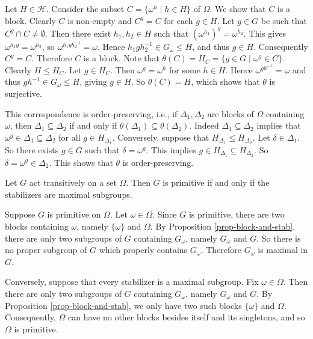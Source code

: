 \begin{sketch}
	Let $H\in\mathcal{H}$. Consider the subset $C = \{\omega^h \mid h \in H\}$ of $\Omega$. We show that $C$ is a block. Clearly $C$ is non-empty and $C^g = C$ for each $g\in H$. Let $g \in G$ be such that $C^g \cap C\neq \emptyset$. Then there exist $h_1, h_2 \in H$ such that $(\omega^{h_1})^g = \omega^{h_2}$. This gives $\omega^{h_1g} = \omega^{h_2}$, so $\omega^{h_1gh_2^{-1}} = \omega$. Hence $h_1gh_2^{-1} \in G_\omega \le H$, and thus $g \in H$. Consequently $C^g = C$. Therefore $C$ is a block. Note that $\theta(C) = H_C = \{g \in G \mid \omega^g \in C\}$. Clearly $H \le H_C$. Let $g \in H_C$. Then $\omega^g = \omega^h$ for some $h \in H$. Hence $\omega^{gh^{-1}} = \omega$ and thus $gh^{-1} \in G_\omega \le H$, giving $g \in H$. So $\theta(C) = H$, which shows that $\theta$ is surjective.
\end{sketch}
\begin{remark}
	This correspondence is order-preserving, i.e., if $\Delta_1,\Delta_2$ are blocks of $\Omega$ containing $\omega$, then $\Delta_1\subseteq \Delta_2$ if and only if $\theta(\Delta_1)\subseteq \theta(\Delta_2)$. Indeed $\Delta_1\subseteq \Delta_2$ implies that $\omega^g \in \Delta_1\subseteq \Delta_2$ for all $g\in H_{\Delta_1}$. Conversely, suppose that $H_{\Delta_1}\leq H_{\Delta_2}$. Let $\delta\in \Delta_1$. So there exists $g\in G$ such that $\delta = \omega^g$. This implies $g\in H_{\Delta_1}\subseteq H_{\Delta_2}$. So $\delta = \omega^g \in \Delta_2$. This shows that $\theta$ is order-preserving.
\end{remark}

\begin{corollary}
	Let $G$ act transitively on a set $\Omega$. Then $G$ is primitive if and only
	if the stabilizers are maximal subgroups.
\end{corollary}
\begin{sketch}
	Suppose $G$ is primitive on $\Omega$. Let $\omega \in \Omega$.  Since $G$ is primitive, there are  two  blocks containing $\omega$, namely $\{\omega\}$ and $\Omega$.  By Proposition \ref{prop-block-and-stab}, there are only two subgroups of $G$ containing $G_\omega$, namely $G_\omega$ and $G$. So there is no proper subgroup of $G$ which properly contains $G_\omega$. Therefore $G_\omega$ is maximal in $G$.
	
	Conversely, suppose that every stabilizer is a maximal subgroup. Fix $\omega\in \Omega$. Then there are only two subgroups of $G$ containing $G_\omega$, namely $G_\omega$ and $G$. By Proposition \ref{prop-block-and-stab}, we only have two such blocks $\{\omega\}$ and $\Omega$.  Consequently, $\Omega$ can have no other blocks besides itself and its singletons, and so $\Omega$ is primitive.
\end{sketch}

